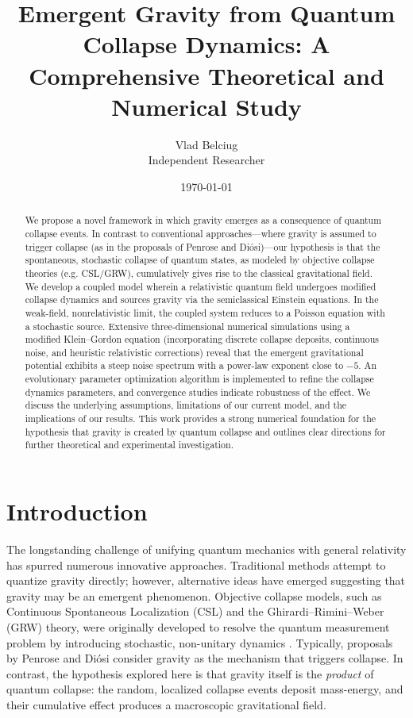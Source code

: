 \documentclass[11pt,a4paper]{article}
\title{Emergent Gravity from Quantum Collapse Dynamics: A Comprehensive Theoretical and Numerical Study}
\author{Vlad Belciug\\ \small Independent Researcher}
\date{\today}
\begin{document}
\maketitle

\begin{abstract}
We propose a novel framework in which gravity emerges as a consequence of quantum collapse events. In contrast to conventional approaches—where gravity is assumed to trigger collapse (as in the proposals of Penrose and Di\'osi)—our hypothesis is that the spontaneous, stochastic collapse of quantum states, as modeled by objective collapse theories (e.g. CSL/GRW), cumulatively gives rise to the classical gravitational field. We develop a coupled model wherein a relativistic quantum field undergoes modified collapse dynamics and sources gravity via the semiclassical Einstein equations. In the weak-field, nonrelativistic limit, the coupled system reduces to a Poisson equation with a stochastic source. Extensive three-dimensional numerical simulations using a modified Klein--Gordon equation (incorporating discrete collapse deposits, continuous noise, and heuristic relativistic corrections) reveal that the emergent gravitational potential exhibits a steep noise spectrum with a power-law exponent close to $-5$. An evolutionary parameter optimization algorithm is implemented to refine the collapse dynamics parameters, and convergence studies indicate robustness of the effect. We discuss the underlying assumptions, limitations of our current model, and the implications of our results. This work provides a strong numerical foundation for the hypothesis that gravity is created by quantum collapse and outlines clear directions for further theoretical and experimental investigation.
\end{abstract}

\section{Introduction}
The longstanding challenge of unifying quantum mechanics with general relativity has spurred numerous innovative approaches. Traditional methods attempt to quantize gravity directly; however, alternative ideas have emerged suggesting that gravity may be an emergent phenomenon. Objective collapse models, such as Continuous Spontaneous Localization (CSL) and the Ghirardi--Rimini--Weber (GRW) theory, were originally developed to resolve the quantum measurement problem by introducing stochastic, non-unitary dynamics \cite{Penrose1996,Diosi1989,Ghirardi1986,Pearle1989}. Typically, proposals by Penrose and Di\'osi consider gravity as the mechanism that triggers collapse. In contrast, the hypothesis explored here is that gravity itself is the \emph{product} of quantum collapse: the random, localized collapse events deposit mass-energy, and their cumulative effect produces a macroscopic gravitational field.
\end{document}
